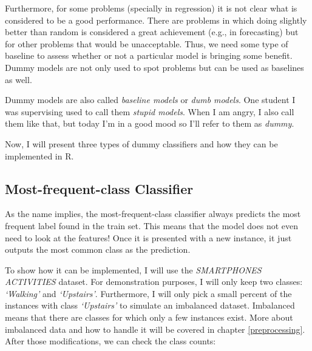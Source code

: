 \documentclass[
  11pt,
]{krantz}
\makeatletter
\newenvironment{Shaded}{\begin{snugshade}}{\end{snugshade}}
\newcommand{\CommentTok}[1]{\textcolor[rgb]{0.37,0.37,0.37}{\textit{#1}}}
\newcommand{\FunctionTok}[1]{\textcolor[rgb]{0,0,0}{#1}}
\newcommand{\NormalTok}[1]{#1}
\newcommand{\SpecialCharTok}[1]{\textcolor[rgb]{0,0,0}{#1}}
\newenvironment{kframe}{%
\medskip{}
\setlength{\fboxsep}{.8em}
 \def\at@end@of@kframe{}%
 \ifinner\ifhmode%
  \def\at@end@of@kframe{\end{minipage}}%
  \begin{minipage}{\columnwidth}%
 \fi\fi%
 \def\FrameCommand##1{\hskip\@totalleftmargin \hskip-\fboxsep
 \colorbox{shadecolor}{##1}\hskip-\fboxsep
     \hskip-\linewidth \hskip-\@totalleftmargin \hskip\columnwidth}%
 \MakeFramed {\advance\hsize-\width
   \@totalleftmargin\z@ \linewidth\hsize
   \@setminipage}}%
 {\par\unskip\endMakeFramed%
 \at@end@of@kframe}
\newenvironment{rmdblock}[1]
  {
  \begin{itemize}
  \renewcommand{\labelitemi}{
    \raisebox{-.7\height}[0pt][0pt]{
      {\setkeys{Gin}{width=3em,keepaspectratio}\texttt{[image: images/icons/\#1]}}
    }
  }
  \setlength{\fboxsep}{1em}
  \begin{kframe}
  \item
  }
  {
  \end{kframe}
  \end{itemize}
  }
\newenvironment{rmdinfo}
  {\begin{rmdblock}{info}}
  {\end{rmdblock}}
\makeatother
\begin{document}
Furthermore, for some problems (specially in regression) it is not clear what is considered to be a good performance. There are problems in which doing slightly better than random is considered a great achievement (e.g., in forecasting) but for other problems that would be unacceptable. Thus, we need some type of baseline to assess whether or not a particular model is bringing some benefit. Dummy models are not only used to spot problems but can be used as baselines as well.

\begin{rmdinfo}
Dummy models are also called \emph{baseline models} or \emph{dumb models}. One student I was supervising used to call them \emph{stupid models}. When I am angry, I also call them like that, but today I'm in a good mood so I'll refer to them as \emph{dummy}.
\end{rmdinfo}

Now, I will present three types of dummy classifiers and how they can be implemented in R.

\hypertarget{most-frequent-class-classifier}{%
\subsection{Most-frequent-class Classifier}\label{most-frequent-class-classifier}}

As the name implies, the most-frequent-class classifier always predicts the most frequent label found in the train set. This means that the model does not even need to look at the features! Once it is presented with a new instance, it just outputs the most common class as the prediction.

To show how it can be implemented, I will use the \emph{SMARTPHONES ACTIVITIES} dataset. For demonstration purposes, I will only keep two classes: \emph{`Walking'} and \emph{`Upstairs'}. Furthermore, I will only pick a small percent of the instances with class \emph{`Upstairs'} to simulate an imbalanced dataset. Imbalanced means that there are classes for which only a few instances exist. More about imbalanced data and how to handle it will be covered in chapter \ref{preprocessing}. After those modifications, we can check the class counts:

\begin{Shaded}
\end{Shaded}
\end{document}
